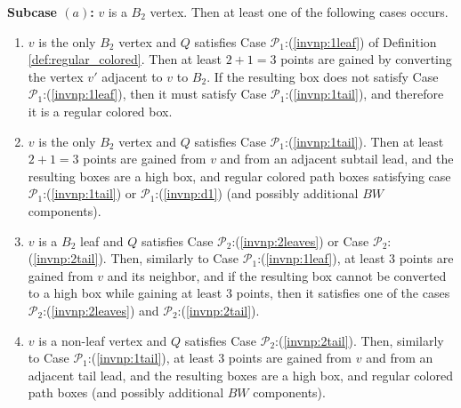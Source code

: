 \documentclass[11pt]{article}
\def\dnsitem{\vspace{-7pt}\item}
\theoremstyle{definition}
\def\propbr{\mathcal{P}_1}
\def\propbbr{\mathcal{P}_2}
\begin{document}
\smallskip
\par\noindent
{\bf Subcase $(a)$:}
$v$ is a $B_2$ vertex. Then at least one of the following cases occurs.
	\begin{enumerate}
		\dnsitem $v$ is the only $B_2$ vertex and $Q$ satisfies Case $\propbr$:(\ref{invnp:1leaf}) of Definition \ref{def:regular_colored}. 
		Then at least $2 + 1 = 3$ points are gained by converting the vertex $v'$ adjacent to $v$ to $B_2$. 
		If the resulting box does not satisfy Case $\propbr$:(\ref{invnp:1leaf}), then it must satisfy Case $\propbr$:(\ref{invnp:1tail}), and therefore it is a regular colored box.
		
		\dnsitem $v$ is the only $B_2$ vertex and $Q$ satisfies Case $\propbr$:(\ref{invnp:1tail}).
		Then at least $2 + 1 = 3$ points are gained from $v$ and from an adjacent subtail lead, and the resulting boxes are a high box, 
		and regular colored path boxes satisfying case $\propbr$:(\ref{invnp:1tail}) or $\propbr$:(\ref{invnp:d1}) 
		(and possibly additional $BW$ components). 
		
		\dnsitem $v$ is a $B_2$ leaf and $Q$ satisfies Case $\propbbr$:(\ref{invnp:2leaves}) or Case $\propbbr$:(\ref{invnp:2tail}). 
		Then, similarly to Case $\propbr$:(\ref{invnp:1leaf}), at least $3$ points are gained from $v$ and its neighbor, and if the resulting box cannot be converted to a high box while gaining at least $3$ points, 
		then it satisfies one of the cases $\propbbr$:(\ref{invnp:2leaves}) and $\propbbr$:(\ref{invnp:2tail}).
		
		\dnsitem $v$ is a non-leaf vertex and $Q$ satisfies Case $\propbbr$:(\ref{invnp:2tail}).
		Then, similarly to Case $\propbr$:(\ref{invnp:1tail}), at least $3$ points are gained from $v$ and from an adjacent tail lead, and the resulting boxes are a high box, and regular colored path boxes 
		(and possibly additional $BW$ components). 
	\end{enumerate}
\end{document}

